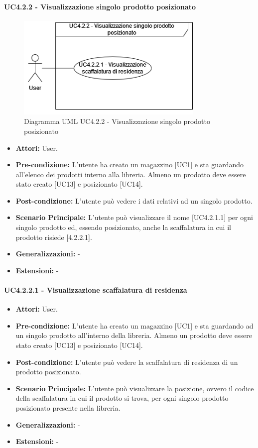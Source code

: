 \paragraph{UC4.2.2 - Visualizzazione singolo prodotto posizionato}
\begin{figure}[H]
  \centering
  \includegraphics[width=0.8\textwidth]{UC_diagrams_1-10/UC4.2.2.drawio.png}
   \caption{Diagramma UML UC4.2.2 - Visualizzazione singolo prodotto posizionato}
\end{figure}
\begin{itemize}
    \item \textbf{Attori:} User.
    \item \textbf{Pre-condizione:}  L'utente ha creato un magazzino [UC1] e sta guardando all'elenco dei prodotti interno alla libreria. Almeno un prodotto deve essere stato creato [UC13] e posizionato [UC14].
    \item \textbf{Post-condizione:}  L'utente può vedere i dati relativi ad un singolo prodotto.
    \item \textbf{Scenario Principale:}  L'utente può visualizzare il nome [UC4.2.1.1] per ogni singolo prodotto ed, essendo posizionato, anche la scaffalatura in cui il prodotto risiede [4.2.2.1]. 
    \item \textbf{Generalizzazioni:} -
    \item \textbf{Estensioni:} -
\end{itemize}


\paragraph{UC4.2.2.1 - Visualizzazione scaffalatura di residenza}
\begin{itemize} 
    \item \textbf{Attori:} User.
    \item \textbf{Pre-condizione:}  L'utente ha creato un magazzino [UC1] e sta guardando ad un singolo prodotto all'interno della libreria. Almeno un prodotto deve essere stato creato [UC13] e posizionato [UC14].
    \item \textbf{Post-condizione:} L'utente può vedere la scaffalatura di residenza di un prodotto posizionato.
    \item \textbf{Scenario Principale:} L'utente può visualizzare la posizione, ovvero il codice della scaffalatura in cui il prodotto si trova, per ogni singolo prodotto posizionato presente nella libreria. 
    \item \textbf{Generalizzazioni:} -
    \item \textbf{Estensioni:} -
\end{itemize}